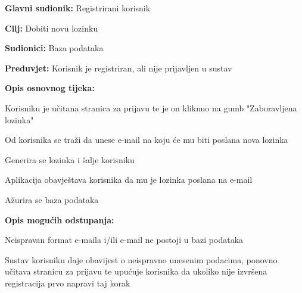 				\noindent {}
				\begin{packed_item}
					
					\item \textbf{Glavni sudionik: } Registrirani korisnik
					\item  \textbf{Cilj:} Dobiti novu lozinku
					\item  \textbf{Sudionici:} Baza podataka
					\item  \textbf{Preduvjet:} Korisnik je registriran, ali nije prijavljen u sustav
					\item  \textbf{Opis osnovnog tijeka:}
					
					\item[] \begin{packed_enum}
				
						\item Korisniku je učitana stranica za prijavu te je on kliknuo na gumb "Zaboravljena lozinka"
						\item Od korisnika se traži da unese e-mail na koju će mu biti poslana nova lozinka
						\item Generira se lozinka i šalje korisniku
						\item Aplikacija obavještava korisnika da mu je lozinka poslana na e-mail
						\item Ažurira se baza podataka
						
					\end{packed_enum}
					
					\item  \textbf{Opis mogućih odstupanja:}
					
					\item[] \begin{packed_item}
						
						\item[2.a]  Neispravan format e-maila i/ili e-mail ne postoji u bazi podataka
						\item[] \begin{packed_enum}
							
							\item Sustav korisniku daje obavijest o neispravno unesenim podacima, ponovno učitava stranicu za prijavu te upućuje korisnika da ukoliko nije izvršena registracija prvo napravi taj korak
							
						\end{packed_enum}
						
					\end{packed_item}
					
				\end{packed_item}
